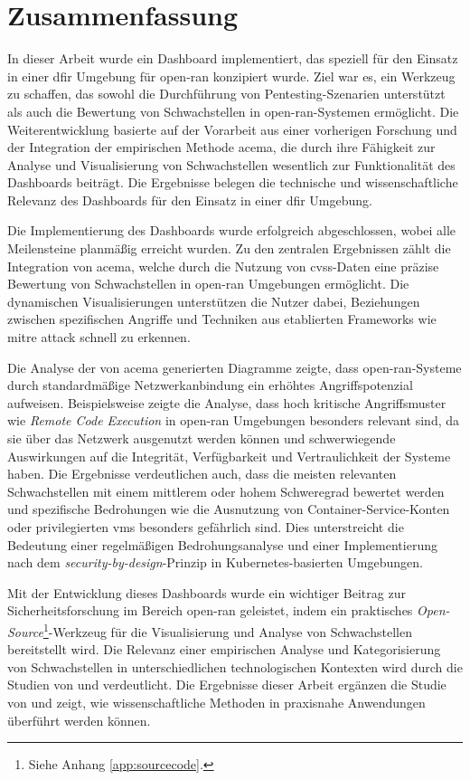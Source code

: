 \chapter{Zusammenfassung}
\label{chap:zusammenfassung}
In dieser Arbeit wurde ein Dashboard implementiert, das speziell für den Einsatz in einer \gls{dfir} Umgebung für \gls{open-ran} konzipiert wurde. Ziel war es, ein Werkzeug zu schaffen, das sowohl die Durchführung von Pentesting-Szenarien unterstützt als auch die Bewertung von Schwachstellen in \gls{open-ran}-Systemen ermöglicht. Die Weiterentwicklung basierte auf der Vorarbeit aus einer vorherigen Forschung und der Integration der empirischen Methode \gls{acema}, die durch ihre Fähigkeit zur Analyse und Visualisierung von Schwachstellen wesentlich zur Funktionalität des Dashboards beiträgt. Die Ergebnisse belegen die technische und wissenschaftliche Relevanz des Dashboards für den Einsatz in einer \gls{dfir} Umgebung.

Die Implementierung des Dashboards wurde erfolgreich abgeschlossen, wobei alle Meilensteine planmäßig erreicht wurden. Zu den zentralen Ergebnissen zählt die Integration von \gls{acema}, welche durch die Nutzung von \gls{cvss}-Daten eine präzise Bewertung von Schwachstellen in \gls{open-ran} Umgebungen ermöglicht. Die dynamischen Visualisierungen unterstützen die Nutzer dabei, Beziehungen zwischen spezifischen Angriffe und Techniken aus etablierten Frameworks wie \gls{mitre} \gls{attack} schnell zu erkennen.

Die Analyse der von \gls{acema} generierten Diagramme zeigte, dass \gls{open-ran}-Systeme durch standardmäßige Netzwerkanbindung ein erhöhtes Angriffspotenzial aufweisen. Beispielsweise zeigte die Analyse, dass hoch kritische Angriffsmuster wie \textit{Remote Code Execution} in \gls{open-ran} Umgebungen besonders relevant sind, da sie über das Netzwerk ausgenutzt werden können und schwerwiegende Auswirkungen auf die Integrität, Verfügbarkeit und Vertraulichkeit der Systeme haben. Die Ergebnisse verdeutlichen auch, dass die meisten relevanten Schwachstellen mit einem mittlerem oder hohem Schweregrad bewertet werden und spezifische Bedrohungen wie die Ausnutzung von Container-Service-Konten oder privilegierten \glspl{vm} besonders gefährlich sind. Dies unterstreicht die Bedeutung einer regelmäßigen Bedrohungsanalyse und einer Implementierung nach dem \textit{security-by-design}-Prinzip in Kubernetes-basierten Umgebungen.

Mit der Entwicklung dieses Dashboards wurde ein wichtiger Beitrag zur Sicherheitsforschung im Bereich \gls{open-ran} geleistet, indem ein praktisches \textit{Open-Source}\footnote{Siehe Anhang \ref{app:sourcecode}.}-Werkzeug für die Visualisierung und Analyse von Schwachstellen bereitstellt wird. Die Relevanz einer empirischen Analyse und Kategorisierung von Schwachstellen in unterschiedlichen technologischen Kontexten wird durch die Studien von \autocite{mazuera-rozoAndroidOSStack2019} und \autocite{klementSecuring6GTransition2024} verdeutlicht. Die Ergebnisse dieser Arbeit ergänzen die Studie von \citeauthor{klementSecuring6GTransition2024} und zeigt, wie wissenschaftliche Methoden in praxisnahe Anwendungen überführt werden können.

